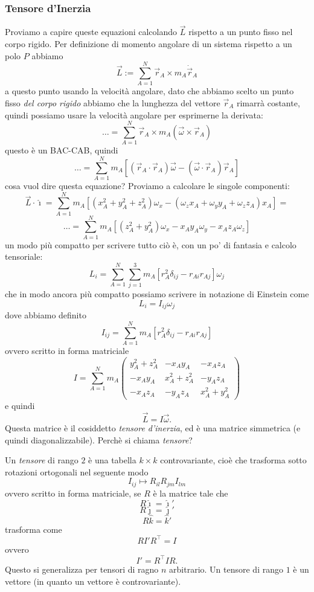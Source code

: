 \documentclass[11pt]{scrartcl}
\newcommand{\ihat}{\hat{\imath}}
\newcommand{\jhat}{\hat{\jmath}}
\newcommand{\khat}{\hat{k}}
\newcommand{\posit}{\vec{r}}
\newcommand{\veloc}{\dot{\vec{r}}}
\begin{document}
	\subsubsection{Tensore d'Inerzia}
	Proviamo a capire queste equazioni calcolando $\vec{L}$ rispetto a un punto fisso nel corpo rigido. Per definizione di momento angolare di un sistema rispetto a un polo $P$ abbiamo
	$$\vec{L}:=\sum_{A=1}^{N}\vec{r}_A\times m_A\veloc_A$$
	a questo punto usando la velocità angolare, dato che abbiamo scelto un punto fisso \textit{del corpo rigido} abbiamo che la lunghezza del vettore $\vec{r}_A$ rimarrà costante, quindi possiamo usare la velocità angolare per esprimerne la derivata:
	$$\dots=\sum_{A=1}^N\vec{r}_A\times m_A\left(\vec{\omega}\times \posit_A\right)$$
	questo è un BAC-CAB, quindi
	$$\dots=\sum_{A=1}^{N}m_A\left[\left(\posit_A\cdot\posit_A\right)\vec{\omega}-\left(\vec{\omega}\cdot \posit_A\right)\posit_A\right]$$
	cosa vuol dire questa equazione? Proviamo a calcolare le singole componenti:
	$$\vec{L}\cdot \ihat=\sum_{A=1}^N m_A\left[(x_A^2+y_A^2+z_A^2)\omega_x-\left(\omega_zx_A+\omega_yy_A+\omega_zz_A\right)x_A\right]=$$
	$$\dots=\sum_{A=1}^{N}m_A\left[(z_A^2+y_A^2)\omega_x-x_Ay_A\omega_y-x_Az_A\omega_z\right]$$
	un modo più compatto per scrivere tutto ciò è, con un po' di fantasia e calcolo tensoriale:
	$$L_i=\sum_{A=1}^{N}\sum_{j=1}^{3}m_A\left[r_A^2\delta_{ij}-r_{Ai}r_{Aj}\right]\omega_j$$che in modo ancora più compatto possiamo scrivere in notazione di Einstein come
	$$L_i=I_{ij}\omega_j$$
	dove abbiamo definito 
	$$I_{ij}=\sum_{A=1}^{N}m_A\left[r_A^2\delta_{ij}-r_{Ai}r_{Aj}\right]$$
	ovvero scritto in forma matriciale
	$$I=\sum_{A=1}^{N}m_A\begin{pmatrix}
		y_A^2+z_A^2 & -x_Ay_A & -x_Az_A \\
		-x_Ay_A & x_A^2+z_A^2 & -y_Az_A \\
		-x_Az_A & -y_Az_A & x_A^2+y_A^2
	\end{pmatrix}$$
	e quindi 
	$$\vec{L}=I\vec{\omega}.$$
	Questa matrice è il cosiddetto \textit{tensore d'inerzia}, ed è una matrice simmetrica (e quindi diagonalizzabile). Perchè si chiama \textit{tensore}? 
	\begin{definition}[Tensore]
		Un \textit{tensore} di rango $2$ è una tabella $k\times k$ controvariante, cioè che trasforma sotto rotazioni ortogonali nel seguente modo
		$$I_{ij}\mapsto R_{il}R_{jm}I_{lm}$$
		ovvero scritto in forma matriciale, se $R$ è la matrice tale che
		$$R\ihat=\ihat'$$
		$$R\jhat=\jhat'$$
		$$R\khat=\khat'$$
		trasforma come
		$$RI'R^{\intercal}=I$$
		ovvero
		$$I'=R^\intercal I R.$$
		Questo si generalizza per tensori di ragno $n$ arbitrario. Un tensore di rango $1$ è un vettore (in quanto un vettore è controvariante).
	\end{definition}
\end{document}
